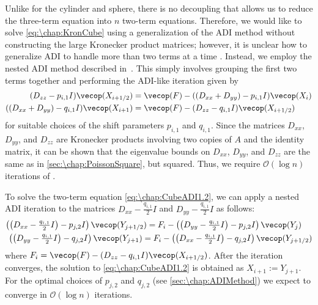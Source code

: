 Unlike for the cylinder and sphere, there is no decoupling that allows us to reduce the three-term equation into $n$ two-term equations. Therefore, we would like to solve \cref{eq:\chap:KronCube} using a generalization of the ADI method without constructing the large Kronecker product matrices; however, it is unclear how to generalize ADI to handle more than two terms at a time \cite[p.~31]{Wachspress_13_01}. Instead, we employ the nested ADI method described in~\cite{Wachspress_94_01}. This simply involves grouping the first two terms together and performing the ADI-like iteration given by
\begin{align}
\label{eq:\chap:CubeADI1.1}
(D_{zz} - p_{i,1}I) \vecop(X_{i+1/2}) &= \vecop(F) - ((D_{xx} + D_{yy}) - p_{i,1}I) \vecop(X_i) \\
\label{eq:\chap:CubeADI1.2}
((D_{xx} + D_{yy}) - q_{i,1}I) \vecop(X_{i+1}) &= \vecop(F) - (D_{zz} - q_{i,1}I) \vecop(X_{i+1/2})
\end{align}
for suitable choices of the shift parameters $p_{i,1}$ and $q_{i,1}$. Since the matrices $D_{xx}$, $D_{yy}$, and $D_{zz}$ are Kronecker products involving two copies of $A$ and the identity matrix, it can be shown that the eigenvalue bounds on $D_{xx}$, $D_{yy}$, and $D_{zz}$ are the same as in \cref{sec:\chap:PoissonSquare}, but squared. Thus, we require $\mathcal{O}(\log n)$ iterations of .

To solve the two-term equation \cref{eq:\chap:CubeADI1.2}, we can apply a nested ADI iteration to the matrices $D_{xx} - \frac{q_{i,1}}{2}I$ and $D_{yy} - \frac{q_{i,1}}{2}I$ as follows: 
\begin{align}
\label{eq:\chap:CubeADI2.1}
\left(\left(D_{xx} - \tfrac{q_{i,1}}{2}I\right) - p_{j,2}I\right) \vecop(Y_{j+1/2}) = F_i - \left(\left(D_{yy} - \tfrac{q_{i,1}}{2}I\right) - p_{j,2}I\right) \vecop(Y_j) \quad\;\\
\label{eq:\chap:CubeADI2.2}
\;\left(\left(D_{yy} - \tfrac{q_{i,1}}{2}I\right) - q_{j,2}I\right) \vecop(Y_{j+1}) = F_i - \left(\left(D_{xx} - \tfrac{q_{i,1}}{2}I\right) - q_{j,2}I\right) \vecop(Y_{j+1/2})
\end{align}
where $F_i = \vecop(F) - (D_{zz} - q_{i,1}I) \vecop(X_{i+1/2})$. After the iteration converges, the solution to \cref{eq:\chap:CubeADI1.2} is obtained as $X_{i+1} := Y_{j+1}$. For the optimal choices of $p_{j,2}$ and $q_{j,2}$ (see \cref{sec:\chap:ADIMethod}) we expect  to converge in $\mathcal{O}(\log n)$ iterations.

